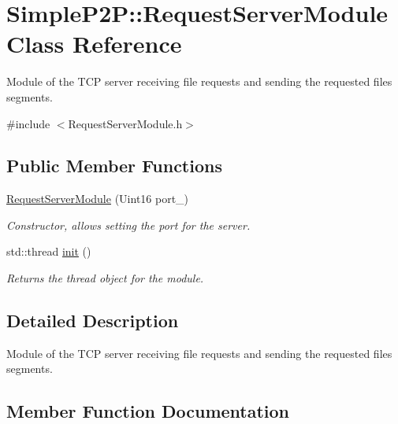 \hypertarget{classSimpleP2P_1_1RequestServerModule}{}\section{Simple\+P2P\+:\+:Request\+Server\+Module Class Reference}
\label{classSimpleP2P_1_1RequestServerModule}


Module of the T\+CP server receiving file requests and sending the requested files\textquotesingle{} segments.  




{\ttfamily \#include $<$Request\+Server\+Module.\+h$>$}

\subsection*{Public Member Functions}
\begin{DoxyCompactItemize}
\item 
\mbox{\label{classSimpleP2P_1_1RequestServerModule_af2338209b76cc5bdf26ea16ee7532579}} 
\hyperlink{classSimpleP2P_1_1RequestServerModule_af2338209b76cc5bdf26ea16ee7532579}{Request\+Server\+Module} (Uint16 port\+\_\+)
\begin{DoxyCompactList}\small\item\em Constructor, allows setting the port for the server. \end{DoxyCompactList}\item 
std\+::thread \hyperlink{classSimpleP2P_1_1RequestServerModule_aa8b342854453de8c7050062fdafbf6cd}{init} ()
\begin{DoxyCompactList}\small\item\em Returns the thread object for the module. \end{DoxyCompactList}\end{DoxyCompactItemize}


\subsection{Detailed Description}
Module of the T\+CP server receiving file requests and sending the requested files\textquotesingle{} segments. 

\subsection{Member Function Documentation}
\mbox{\label{classSimpleP2P_1_1RequestServerModule_aa8b342854453de8c7050062fdafbf6cd}} 
